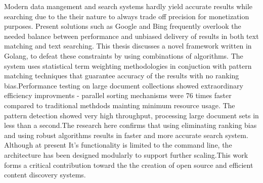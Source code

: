 Modern data mangement and search systems hardly yield accurate results while searching due to the their nature to always trade off precision
for monetization purposes. Present solutions such as Google and Bing frequently overlook the needed balance between performance and unbiased 
delivery of results in both text matching and text searching. This thesis discusses a novel framework written in Golang, to defeat these constraints 
by using combinations of algorithms. The system uses statistical term weighting methodologies in conjuction with pattern matching techniques
that guarantee accuracy of the results with no ranking bias.Performance testing on large document collections showed extraordinary efficiency
improvments - parallel sorting mechanisms were 76 times faster compared to traditional methdods mainting minimum resource usage. The pattern
detection showed very high throughput, processing large document sets in less than a second.The research here confirms that using eliminating 
ranking bias and using robust algorithms results in faster and more accurate search system. Although at present It's functionality is limited
to the command line, the architecture has been designed modularly to support further scaling.This work forms a critical contribution 
toward the the creation of open source and efficient content discovery systems. 